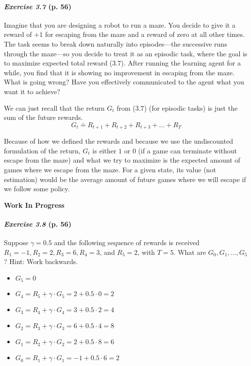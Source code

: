 \documentclass[10pt,a4paper]{article}
\begin{document}
\paragraph{\textit{Exercise 3.7} (p. 56)} Imagine that you are designing a robot to run a maze. You decide to give it a reward of $+1$ for escaping from the maze and a reward of zero at all other times. The task seems to break down naturally into episodes---the successive runs through the maze---so
you decide to treat it as an episodic task, where the goal is to maximize expected total reward ($3.7$). After running the learning agent for a while, you find that it is showing no improvement in escaping from the maze. What is going wrong? Have you effectively communicated to the agent what you want it to achieve?

\bigskip
We can just recall that the return $G_t$ from ($3.7$) (for episodic tasks) is just the sum of the future rewards.
\begin{equation}
G_t \doteq R_{t+1} + R_{t+2} + R_{t+3} + \hdots + R_T
\end{equation}

Because of how we defined the rewards and because we use the undiscounted formulation of the return, $G_t$ is either $1$ or $0$ (if a game can terminate without escape from the maze) and what we try to maximize is the expected amount of games where we escape from the maze. For a given state, its value (not estimation) would be the average amount of future games where we will escape if we follow some policy.

\textbf{Work In Progress}

\paragraph{\textit{Exercise 3.8} (p. 56)} Suppose $\gamma = 0.5$ and the following sequence of rewards is received $R_1 = -1,
R_2 = 2, R_3 = 6, R_4 = 3$, and $R_5 = 2$, with $T = 5$. What are $G_0, G_1, \hdots, G_5$? Hint:
Work backwards.

\bigskip
\begin{itemize}
\item $G_5=0$
\item $G_4=R_5 + \gamma \cdot G_5 = 2 + 0.5 \cdot 0 = 2$
\item $G_3=R_4 + \gamma \cdot G_4 = 3 + 0.5 \cdot 2 = 4$
\item $G_2=R_3 + \gamma \cdot G_3 = 6 + 0.5 \cdot 4 = 8$
\item $G_1=R_2 + \gamma \cdot G_2 = 2 + 0.5 \cdot 8 = 6$
\item $G_0=R_1 + \gamma \cdot G_1 = -1 + 0.5 \cdot 6 = 2$
\end{itemize}
\end{document}
